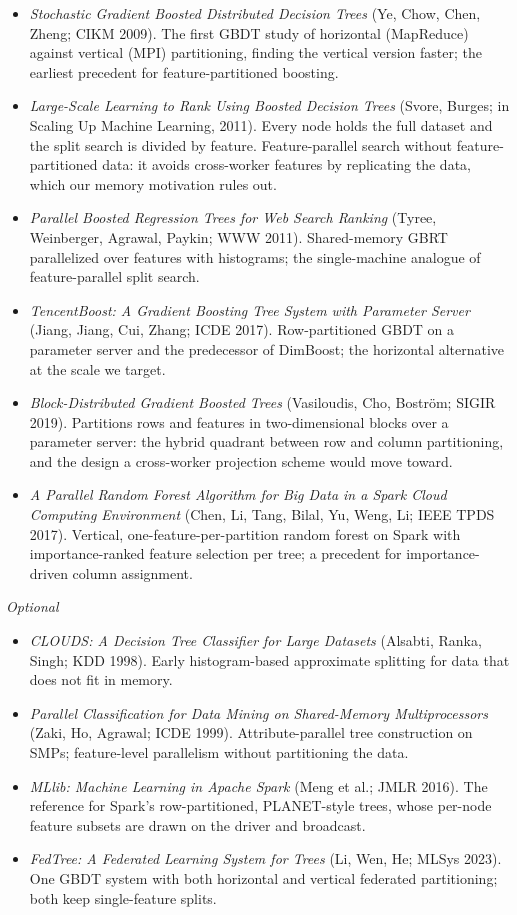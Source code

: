 \documentclass[sigconf,screen]{acmart}
\begin{document}
\begin{itemize}
    \item \textit{Stochastic Gradient Boosted Distributed Decision Trees} (Ye, Chow, Chen, Zheng; CIKM 2009). The first GBDT study of horizontal (MapReduce) against vertical (MPI) partitioning, finding the vertical version faster; the earliest precedent for feature-partitioned boosting.
    \item \textit{Large-Scale Learning to Rank Using Boosted Decision Trees} (Svore, Burges; in Scaling Up Machine Learning, 2011). Every node holds the full dataset and the split search is divided by feature. Feature-parallel search without feature-partitioned data: it avoids cross-worker features by replicating the data, which our memory motivation rules out.
    \item \textit{Parallel Boosted Regression Trees for Web Search Ranking} (Tyree, Weinberger, Agrawal, Paykin; WWW 2011). Shared-memory GBRT parallelized over features with histograms; the single-machine analogue of feature-parallel split search.
    \item \textit{TencentBoost: A Gradient Boosting Tree System with Parameter Server} (Jiang, Jiang, Cui, Zhang; ICDE 2017). Row-partitioned GBDT on a parameter server and the predecessor of DimBoost; the horizontal alternative at the scale we target.
    \item \textit{Block-Distributed Gradient Boosted Trees} (Vasiloudis, Cho, Bostr\"om; SIGIR 2019). Partitions rows and features in two-dimensional blocks over a parameter server: the hybrid quadrant between row and column partitioning, and the design a cross-worker projection scheme would move toward.
    \item \textit{A Parallel Random Forest Algorithm for Big Data in a Spark Cloud Computing Environment} (Chen, Li, Tang, Bilal, Yu, Weng, Li; IEEE TPDS 2017). Vertical, one-feature-per-partition random forest on Spark with importance-ranked feature selection per tree; a precedent for importance-driven column assignment.
\end{itemize}

\textit{Optional}

\begin{itemize}
    \item \textit{CLOUDS: A Decision Tree Classifier for Large Datasets} (Alsabti, Ranka, Singh; KDD 1998). Early histogram-based approximate splitting for data that does not fit in memory.
    \item \textit{Parallel Classification for Data Mining on Shared-Memory Multiprocessors} (Zaki, Ho, Agrawal; ICDE 1999). Attribute-parallel tree construction on SMPs; feature-level parallelism without partitioning the data.
    \item \textit{MLlib: Machine Learning in Apache Spark} (Meng et al.; JMLR 2016). The reference for Spark's row-partitioned, PLANET-style trees, whose per-node feature subsets are drawn on the driver and broadcast.
    \item \textit{FedTree: A Federated Learning System for Trees} (Li, Wen, He; MLSys 2023). One GBDT system with both horizontal and vertical federated partitioning; both keep single-feature splits.
\end{itemize}
\end{document}
